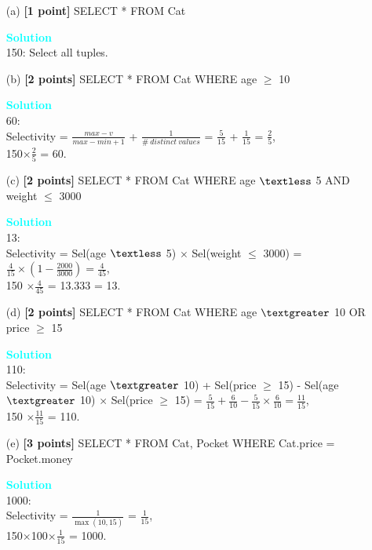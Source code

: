 \documentclass[10pt]{article}
\newenvironment{solution}
    { \begin{mdframed}[backgroundcolor=gray!10] \textcolor{cyan}{\textbf{Solution}} \\}
    {  \end{mdframed}}
\begin{document}
\begin{itemize}
	\item[(a)] \textbf{[1 point]} SELECT * FROM Cat
	      \begin{solution}
		      150: Select all tuples.
	      \end{solution}
	\item[(b)] \textbf{[2 points]} SELECT * FROM Cat WHERE age $\geq$ 10
	      \begin{solution}
		      60: \\
		      Selectivity = $\frac{max - v}{max - min + 1}$ + $\frac{1}{\#\  distinct\ values}$ = $\frac{5}{15}$ + $\frac{1}{15}$ = $\frac{2}{5}$, \\
		      150$\times \frac{2}{5}$ = 60.
	      \end{solution}
	\item[(c)] \textbf{[2 points]} SELECT * FROM Cat WHERE age $\textless$ 5 AND weight $\leq$ 3000
	      \begin{solution}
		      13: \\
		      Selectivity = Sel(age $\textless$ 5) $\times$ Sel(weight $\leq$ 3000) = $\frac{4}{15} \times \left( 1- \frac{2000}{3000} \right) = \frac{4}{45}$, \\
		      150 $\times \frac{4}{45}$ = 13.333 = 13.
	      \end{solution}
	\item[(d)] \textbf{[2 points]} SELECT * FROM Cat WHERE age $\textgreater$ 10 OR price $\geq$ 15
	      \begin{solution}
		      110: \\
		      Selectivity = Sel(age $\textgreater$ 10) + Sel(price $\geq$ 15) - Sel(age $\textgreater$ 10) $\times$ Sel(price $\geq$ 15) = $\frac{5}{15} + \frac{6}{10} - \frac{5}{15} \times\frac{6}{10} = \frac{11}{15}$, \\
		      150 $\times \frac{11}{15}$ = 110.
	      \end{solution}
	\item[(e)] \textbf{[3 points]} SELECT * FROM Cat, Pocket WHERE Cat.price = Pocket.money
	      \begin{solution}
		      1000: \\
		      Selectivity = $\frac{1}{\max (10,15)}$ = $\frac{1}{15}$, \\
		      150$\times$100$\times\frac{1}{15}$ = 1000.
	      \end{solution}
\end{itemize}
\end{document}
